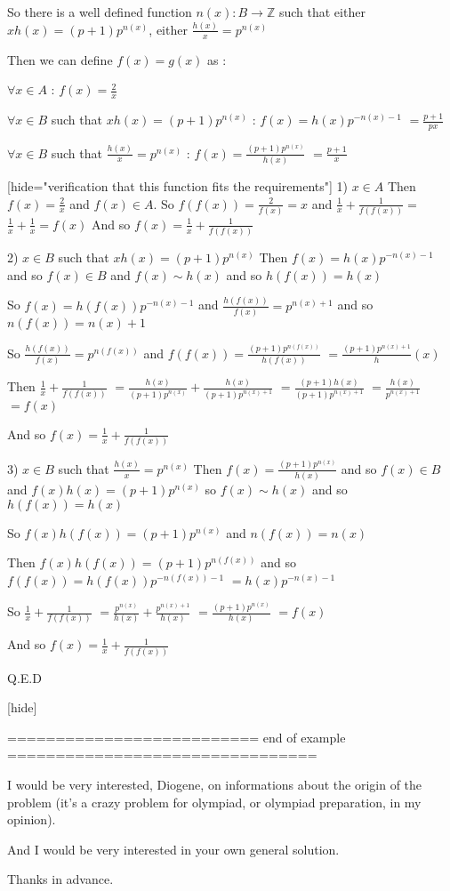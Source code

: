 \begin{solution}
So there is a well defined function $ n(x): B\to\mathbb Z$ such that either $ xh(x) = (p + 1)p^{n(x)}$, either $ \frac {h(x)}x = p^{n(x)}$

Then we can define $ f(x) = g(x)$ as :

$ \forall x\in A$ : $ f(x) = \frac 2x$

$ \forall x\in B$ such that $ xh(x) = (p + 1)p^{n(x)}$ : $ f(x) = h(x)p^{ - n(x) - 1}$ $ =\frac{p+1}{px}$

$ \forall x\in B$ such that $ \frac {h(x)}x = p^{n(x)}$ : $ f(x) = \frac {(p + 1)p^{n(x)}}{h(x)}$ $ =\frac{p+1}x$


[hide="verification that this function fits the requirements"]
1) $ x\in A$
Then $ f(x) = \frac 2x$ and $ f(x)\in A$. So $ f(f(x)) = \frac 2{f(x)} = x$ and $ \frac 1x + \frac 1{f(f(x))} =$ $ \frac 1x + \frac 1x = f(x)$
And so $ f(x) = \frac 1x + \frac 1{f(f(x))}$

2) $ x\in B$ such that $ xh(x) = (p + 1)p^{n(x)}$
Then $ f(x)=h(x)p^{ - n(x) - 1}$ and so $ f(x)\in B$ and $ f(x)\sim h(x)$ and so $ h(f(x)) = h(x)$

So $ f(x) = h(f(x))p^{ - n(x) - 1}$ and $ \frac {h(f(x))}{f(x)} = p^{n(x) + 1}$ and so $ n(f(x)) = n(x) + 1$

So $ \frac {h(f(x))}{f(x)} = p^{n(f(x))}$ and $ f(f(x)) = \frac {(p + 1)p^{n(f(x))}}{h(f(x))}$ ${ = \frac {(p + 1)p^{n(x) + 1}}h(x)}$

Then $ \frac 1x + \frac 1{f(f(x))}$ $ = \frac {h(x)}{(p + 1)p^{n(x)}} + \frac {h(x)}{(p + 1)p^{n(x) + 1}}$ $ = \frac {(p + 1)h(x)}{(p + 1)p^{n(x) + 1}}$ $ = \frac {h(x)}{p^{n(x) + 1}}$ $ = f(x)$

And so $ f(x) = \frac 1x + \frac 1{f(f(x))}$

3) $ x\in B$ such that $ \frac {h(x)}x = p^{n(x)}$
Then $ f(x) = \frac {(p + 1)p^{n(x)}}{h(x)}$ and so $ f(x)\in B$ and $ f(x)h(x) = (p + 1)p^{n(x)}$ so $ f(x)\sim h(x)$ and so $ h(f(x)) = h(x)$

So $ f(x)h(f(x)) = (p + 1)p^{n(x)}$ and $ n(f(x)) = n(x)$

Then $ f(x)h(f(x)) = (p + 1)p^{n(f(x))}$ and so $ f(f(x)) = h(f(x))p^{ - n(f(x)) - 1}$ $ = h(x)p^{ - n(x) - 1}$

So $ \frac 1x + \frac 1{f(f(x))}$ $ = \frac {p^{n(x)}}{h(x)} + \frac {p^{n(x) + 1}}{h(x)}$ $ = \frac {(p + 1)p^{n(x)}}{h(x)}$ $ = f(x)$

And so $ f(x) = \frac 1x + \frac 1{f(f(x))}$


Q.E.D

[\/hide]



========================== end of example ================================

I would be very interested, Diogene, on informations about the origin of the problem (it's a crazy problem for olympiad, or olympiad preparation, in my opinion).

And I would be very interested in your own general solution.

Thanks in advance.
\end{solution}



